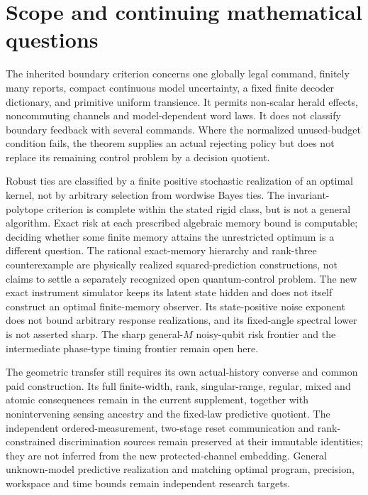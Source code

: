 \section{Scope and continuing mathematical questions}\label{sec:r68-scope}
The inherited boundary criterion concerns one globally legal command, finitely many reports, compact continuous model uncertainty, a fixed finite decoder dictionary, and primitive uniform transience. It permits non-scalar herald effects, noncommuting channels and model-dependent word laws. It does not classify boundary feedback with several commands. Where the normalized unused-budget condition fails, the theorem supplies an actual rejecting policy but does not replace its remaining control problem by a decision quotient.

Robust ties are classified by a finite positive stochastic realization of an optimal kernel, not by arbitrary selection from wordwise Bayes ties. The invariant-polytope criterion is complete within the stated rigid class, but is not a general algorithm. Exact risk at each prescribed algebraic memory bound is computable; deciding whether some finite memory attains the unrestricted optimum is a different question. The rational exact-memory hierarchy and rank-three counterexample are physically realized squared-prediction constructions, not claims to settle a separately recognized open quantum-control problem. The new exact instrument simulator keeps its latent state hidden and does not itself construct an optimal finite-memory observer. Its state-positive noise exponent does not bound arbitrary response realizations, and its fixed-angle spectral lower is not asserted sharp. The sharp general-$M$ noisy-qubit risk frontier and the intermediate phase-type timing frontier remain open here.

The geometric transfer still requires its own actual-history converse and common paid construction. Its full finite-width, rank, singular-range, regular, mixed and atomic consequences remain in the current supplement, together with nonintervening sensing ancestry and the fixed-law predictive quotient. The independent ordered-measurement, two-stage reset communication and rank-constrained discrimination sources remain preserved at their immutable identities; they are not inferred from the new protected-channel embedding. General unknown-model predictive realization and matching optimal program, precision, workspace and time bounds remain independent research targets.


